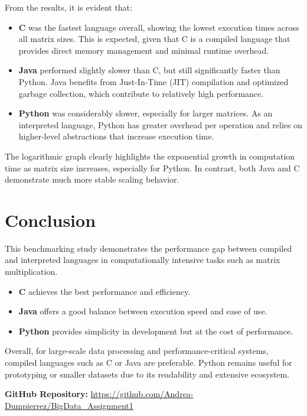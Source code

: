 \documentclass[a4paper,12pt]{article}
\begin{document}
From the results, it is evident that:
\begin{itemize}
    \item \textbf{C} was the fastest language overall, showing the lowest execution times across all matrix sizes. This is expected, given that C is a compiled language that provides direct memory management and minimal runtime overhead.
    \item \textbf{Java} performed slightly slower than C, but still significantly faster than Python. Java benefits from Just-In-Time (JIT) compilation and optimized garbage collection, which contribute to relatively high performance.
    \item \textbf{Python} was considerably slower, especially for larger matrices. As an interpreted language, Python has greater overhead per operation and relies on higher-level abstractions that increase execution time.
\end{itemize}

The logarithmic graph clearly highlights the exponential growth in computation time as matrix size increases, especially for Python. In contrast, both Java and C demonstrate much more stable scaling behavior.

\section*{Conclusion}

This benchmarking study demonstrates the performance gap between compiled and interpreted languages in computationally intensive tasks such as matrix multiplication.

\begin{itemize}
    \item \textbf{C} achieves the best performance and efficiency.
    \item \textbf{Java} offers a good balance between execution speed and ease of use.
    \item \textbf{Python} provides simplicity in development but at the cost of performance.
\end{itemize}

Overall, for large-scale data processing and performance-critical systems, compiled languages such as C or Java are preferable. Python remains useful for prototyping or smaller datasets due to its readability and extensive ecosystem.

\vspace{1cm}
\noindent\textbf{GitHub Repository:} \href{https://github.com/Andrea-Dumpierrez/BigData_Assignment1}{https://github.com/Andrea-Dumpierrez/BigData\_Assignment1}
\end{document}
